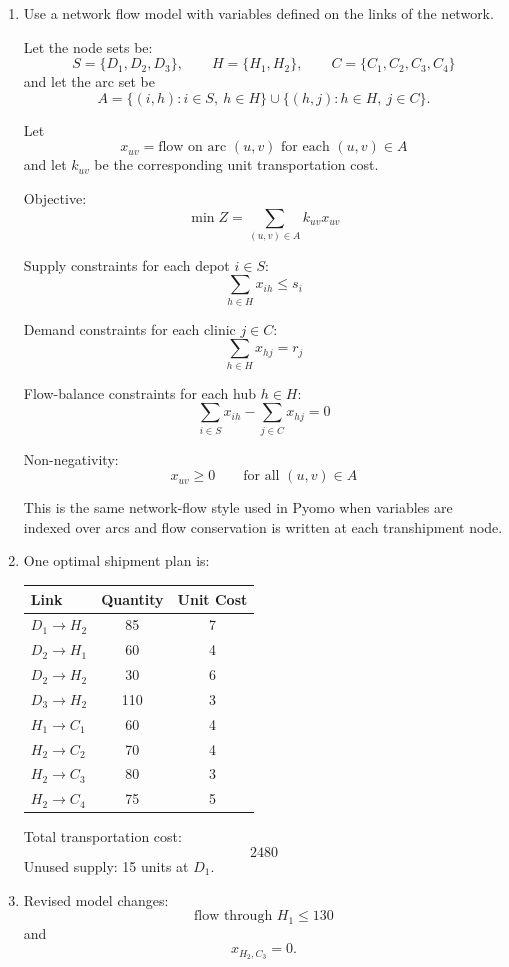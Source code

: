 \documentclass[11pt,a4paper]{article}
\begin{document}
\begin{enumerate}
\item Use a network flow model with variables defined on the links of the network.

Let the node sets be:
\[
S=\{D_1,D_2,D_3\}, \qquad H=\{H_1,H_2\}, \qquad C=\{C_1,C_2,C_3,C_4\}
\]
and let the arc set be
\[
A=\{(i,h): i \in S,\ h \in H\} \cup \{(h,j): h \in H,\ j \in C\}.
\]

Let
\[
x_{uv}=\text{flow on arc }(u,v)\text{ for each }(u,v)\in A
\]
and let $k_{uv}$ be the corresponding unit transportation cost.

Objective:
\[
\min Z=\sum_{(u,v)\in A} k_{uv}x_{uv}
\]

Supply constraints for each depot $i \in S$:
\[
\sum_{h \in H} x_{ih} \le s_i
\]

Demand constraints for each clinic $j \in C$:
\[
\sum_{h \in H} x_{hj} = r_j
\]

Flow-balance constraints for each hub $h \in H$:
\[
\sum_{i \in S} x_{ih} - \sum_{j \in C} x_{hj} = 0
\]

Non-negativity:
\[
x_{uv} \ge 0 \qquad \text{for all } (u,v)\in A
\]

This is the same network-flow style used in Pyomo when variables are indexed over arcs and flow conservation is written at each transhipment node.

\item One optimal shipment plan is:

\begin{center}
\begin{tabular}{lcc}
\toprule
Link & Quantity & Unit Cost \\
\midrule
$D_1 \to H_2$ & 85 & 7 \\
$D_2 \to H_1$ & 60 & 4 \\
$D_2 \to H_2$ & 30 & 6 \\
$D_3 \to H_2$ & 110 & 3 \\
$H_1 \to C_1$ & 60 & 4 \\
$H_2 \to C_2$ & 70 & 4 \\
$H_2 \to C_3$ & 80 & 3 \\
$H_2 \to C_4$ & 75 & 5 \\
\bottomrule
\end{tabular}
\end{center}

Total transportation cost:
\[
2480
\]
Unused supply: 15 units at $D_1$.

\item Revised model changes:
\[
\text{flow through }H_1 \le 130
\]
and
\[
x_{H_2,C_3}=0.
\]


\end{enumerate}
\end{document}
